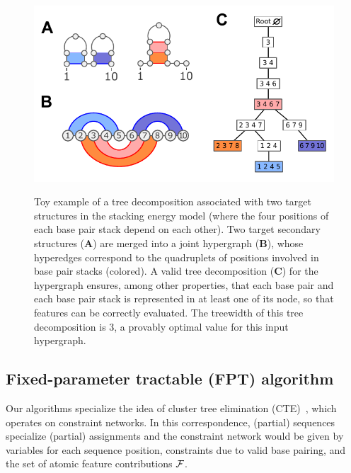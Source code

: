\documentclass[]{bmcart}
\newcommand{\citep}[1]{\cite{#1}}
\newcommand{\citet}[1]{\cite{#1}}
\newcommand{\revised}[1]{{\color{red} #1}}
\begin{document}
\begin{figure}
{\centering \includegraphics[width=.9\linewidth]{Figs/example-treedec-stacking}\\}
\caption{\revised{Toy example of a tree decomposition associated with two target structures in the stacking energy model (where the four positions of each base pair stack depend on each other). Two target secondary structures ({\bfseries\sffamily A}) are merged into a joint hypergraph ({\bfseries\sffamily B}), whose hyperedges correspond to the quadruplets of positions involved in base pair stacks (colored). A valid tree decomposition ({\bfseries\sffamily C}) for the hypergraph ensures, among other properties, that each base pair and each base pair stack is represented in at least one of its node, so that features can be correctly evaluated. The treewidth of this tree decomposition is 3, a provably optimal value for this input hypergraph.}\label{fig:treedec}}
\end{figure}

\subsection*{Fixed-parameter tractable (FPT) algorithm}
\label{sec:FPT}



Our algorithms specialize the idea of cluster tree elimination (CTE)~\citep{Dechter2013}, which operates on constraint networks. In this correspondence, (partial) sequences specialize (partial) assignments and the constraint network would be given by variables for each sequence position, constraints due to valid base pairing, and the set of atomic feature contributions $\cal F$.
\end{document}
